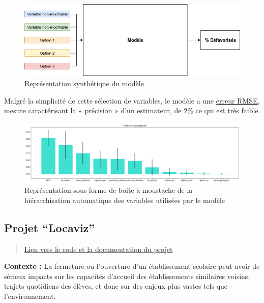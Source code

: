 \documentclass[]{book}
\begin{document}
\begin{figure}

{\centering \includegraphics[width=0.6\linewidth]{./img/model-diag} 

}

\caption{Représentation synthétique du modèle}\label{fig:unnamed-chunk-3}
\end{figure}

Malgré la simplicité de cette sélection de variables, le modèle a une
\href{https://fr.wikipedia.org/wiki/Erreur_quadratique_moyenne}{erreur
RMSE}, mesure caractérisant la « précision » d'un estimateur, de 2\% ce
qui est très faible.

\begin{figure}

{\centering \includegraphics[width=1\linewidth]{./img/model-vars} 

}

\caption{Représentation sous forme de boite à moustache de la hiérarchisation automatique des variables utilisées par le modèle}\label{fig:unnamed-chunk-4}
\end{figure}

\subsection{\texorpdfstring{Projet
``Locaviz''}{Projet Locaviz}}\label{projet-locaviz}

\begin{quote}
\href{https://drive.google.com/file/d/1gpl02y7FG4hOCEh2t55YRlaRyTP010Pj/view?usp=sharing}{Lien
vers le code et la documentation du projet}
\end{quote}

\textbf{Contexte :} La fermeture ou l'ouverture d'un établissement
scolaire peut avoir de sérieux impacts sur les capacités d'accueil des
établissements similaires voisins, trajets quotidiens des élèves, et
donc sur des enjeux plus vastes tels que l'environnement.
\end{document}
